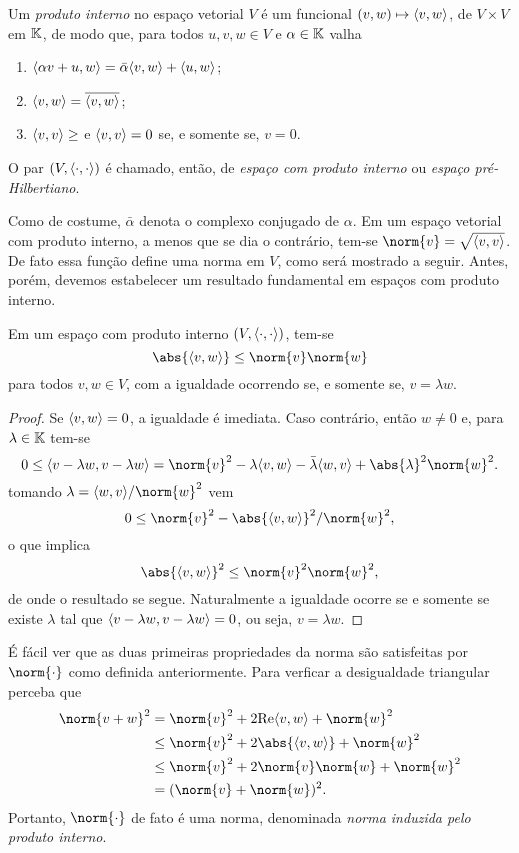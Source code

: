 \begin{defn}
    Um \emph{produto interno} no espaço vetorial \( V \) é um funcional \( (v, w) \mapsto \langle v,w\rangle \), de \( V \times V \) em \( \mathbb{K} \), de modo que, para todos \( u, v, w \in V \) e \( \alpha \in \mathbb{K} \) valha
    \begin{enumerate}[label=\roman*)]
        \item \( \langle\alpha v + u, w\rangle = \bar{\alpha} \langle v, w\rangle + \langle u, w\rangle \);
        \item \( \langle v, w\rangle = \overline{\langle v,w\rangle} \);
        \item \( \langle v, v\rangle \geq \) e \( \langle v, v\rangle = 0 \) se, e somente se, \( v = 0 \).
    \end{enumerate}
    O par \( (V, \langle\cdot,\cdot\rangle) \) é chamado, então, de \emph{espaço com produto interno} ou \emph{espaço pré-Hilbertiano}.
\end{defn}
Como de costume, \( \bar{\alpha} \) denota o complexo conjugado de \( \alpha \).
Em um espaço vetorial com produto interno, a menos que se dia o contrário, tem-se \( \norm{ v } = \sqrt{ \dotprod{v,v} } \).
De fato essa função define uma norma em \( V \), como será mostrado a seguir.
Antes, porém, devemos estabelecer um resultado fundamental em espaços com produto interno.
\begin{teo}
    Em um espaço com produto interno \( (V, \langle\cdot,\cdot\rangle) \), tem-se \[
        \abs{ \dotprod{v, w} } \leq \norm{ v } \norm{ w }
    \]
    para todos \( v, w \in V \), com a igualdade ocorrendo se, e somente se, \( v = \lambda w \).
\end{teo}
\begin{proof}
    Se \( \langle v, w\rangle = 0 \), a igualdade é imediata.
    Caso contrário, então \( w \neq 0 \) e, para \( \lambda \in \mathbb{K} \) tem-se \[
        0 \leq \dotprod{v - \lambda w, v - \lambda w} = \norm{ v }^2 -\lambda \dotprod{v, w} -\bar{\lambda} \dotprod{w, v} + \abs{ \lambda }^2 \norm{ w }^2
    .\]
    tomando \( \lambda = \dotprod{w, v}/\norm{ w }^2 \) vem \[
        0 \leq \norm{ v }^2 - \abs{ \dotprod{v, w} }^2/ \norm{ w }^2
    ,\]
    o que implica \[
        \abs{ \dotprod{v, w} }^2 \leq \norm{ v }^2 \norm{ w }^2
    ,\]
    de onde o resultado se segue.
    Naturalmente a igualdade ocorre se e somente se existe \( \lambda \) tal que \( \langle v - \lambda w, v - \lambda w\rangle = 0 \), ou seja, \( v = \lambda w \).
\end{proof}

É fácil ver que as duas primeiras propriedades da norma são satisfeitas por \( \norm{ \cdot } \) como definida anteriormente.
Para verficar a desigualdade triangular perceba que
\begin{align*}
    \norm{ v + w }^2
    &= \norm{ v }^2 + 2 \Re \dotprod{v, w} + \norm{ w }^2 \\
    &\leq \norm{ v }^2 + 2 \abs{ \dotprod{v, w} } + \norm{ w }^2 \\
    &\leq \norm{ v }^2 + 2 \norm{ v } \norm{ w } + \norm{ w }^2 \\
    &= ( \norm{ v } + \norm{ w } )^2
.\end{align*}
Portanto, \( \norm{ \cdot } \) de fato é uma norma, denominada \emph{norma induzida pelo produto interno}.

